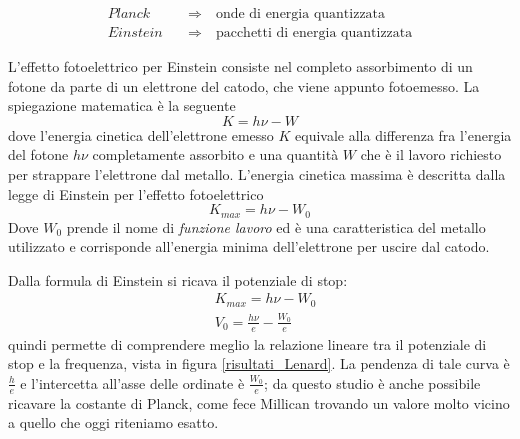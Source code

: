 \begin{equation}
\begin{split}
Planck \quad & \Rightarrow \quad \mbox{onde di energia quantizzata} \\
Einstein \quad & \Rightarrow \quad \mbox{pacchetti di energia quantizzata} 
\end{split}
\end{equation}

L'effetto fotoelettrico per Einstein consiste nel completo assorbimento di un fotone da parte di un elettrone del catodo, che viene appunto fotoemesso.
La spiegazione matematica è la seguente
\begin{equation}
K = h\nu - W
\end{equation}
dove l'energia cinetica dell'elettrone emesso $K$ equivale alla differenza fra l'energia del fotone $h\nu$ completamente assorbito e una quantità $W$ che è il lavoro richiesto per strappare l'elettrone dal metallo.
L'energia cinetica massima è descritta dalla legge di Einstein per l'effetto fotoelettrico
\begin{equation}
K_{max} = h\nu - W_0
\end{equation}
Dove $W_0$ prende il nome di \textit{funzione lavoro} ed è una caratteristica del metallo utilizzato e corrisponde all'energia minima dell'elettrone per uscire dal catodo.

Dalla formula di Einstein si ricava il potenziale di stop:
\begin{equation}
\begin{split}
& K_{max} = h\nu - W_0 \\
& V_0 = \frac{ h\nu}{e } - \frac{ W_0}{e }
\end{split}
\end{equation}
quindi permette di comprendere meglio la relazione lineare tra il potenziale  di stop e la frequenza, vista in figura \ref{risultati_Lenard}.
La pendenza di tale curva è $\frac{ h}{e }$ e l'intercetta all'asse delle ordinate è $\frac{ W_0}{e }$; da questo studio è anche possibile ricavare la costante di Planck, come fece Millican trovando un valore molto vicino a quello che oggi riteniamo esatto.

\newpage

